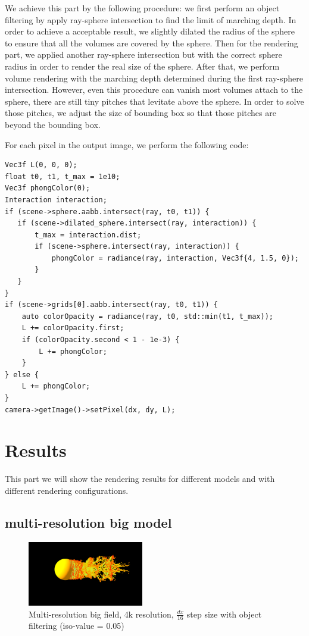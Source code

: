 \documentclass[acmtog]{acmart}
\begin{document}
    We achieve this part by the following procedure: we first perform an object filtering by apply ray-sphere intersection to find the limit of marching depth.
    In order to achieve a acceptable result, we slightly dilated the radius of the sphere to ensure that all the volumes are covered by the sphere.
    Then for the rendering part, we applied another ray-sphere intersection but with the correct sphere radius in order to render the real size of the sphere.
    After that, we perform volume rendering with the marching depth determined during the first ray-sphere intersection.
    However, even this procedure can vanish most volumes attach to the sphere, there are still tiny pitches that levitate above the sphere.
    In order to solve those pitches, we adjust the size of bounding box so that those pitches are beyond the bounding box.

    For each pixel in the output image, we perform the following code:
    \begin{lstlisting}[label={lst:lstlisting3}]
Vec3f L(0, 0, 0);
float t0, t1, t_max = 1e10;
Vec3f phongColor(0);
Interaction interaction;
if (scene->sphere.aabb.intersect(ray, t0, t1)) {
   if (scene->dilated_sphere.intersect(ray, interaction)) {
       t_max = interaction.dist;
       if (scene->sphere.intersect(ray, interaction)) {
           phongColor = radiance(ray, interaction, Vec3f{4, 1.5, 0});
       }
   }
}
if (scene->grids[0].aabb.intersect(ray, t0, t1)) {
    auto colorOpacity = radiance(ray, t0, std::min(t1, t_max));
    L += colorOpacity.first;
    if (colorOpacity.second < 1 - 1e-3) {
        L += phongColor;
    }
} else {
    L += phongColor;
}
camera->getImage()->setPixel(dx, dy, L);
    \end{lstlisting}


    \section{Results}\label{sec:results}
    This part we will show the rendering results for different models and with different rendering configurations.

    \subsection{multi-resolution big model}\label{subsec:multi-resolution-big-model}
    \begin{figure}[H]
        \centering
        \includegraphics[width=0.45\textwidth]{./image/multi_big_4k_16_filter}
        \caption{Multi-resolution big field, 4k resolution, $ \frac{dx}{16} $ step size with object filtering (iso-value = 0.05)}\label{fig:figure1}
    \end{figure}
\end{document}
